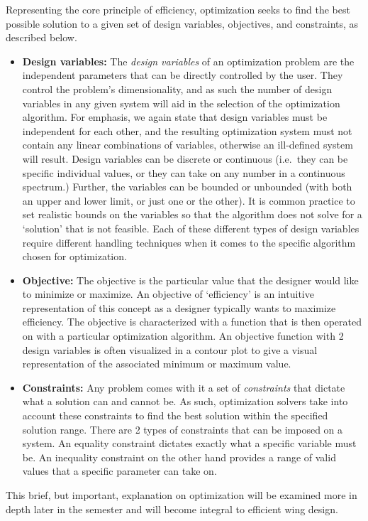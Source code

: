 \documentclass{article}
\begin{document}
Representing the core principle of efficiency, optimization seeks to find the best possible solution to a given set of design variables, objectives, and constraints, as described below.
    \begin{itemize}
        \item[] \textbf{Design variables:} The \textit{design variables} of an optimization problem are the independent parameters that can be directly controlled by the user. They control the problem's dimensionality, and as such the number of design variables in any given system will aid in the selection of the optimization algorithm.
        For emphasis, we again state that design variables must be independent for each other, and the resulting optimization system must not contain any linear combinations of variables, otherwise an ill-defined system will result.
        Design variables can be discrete or continuous (i.e.\ they can be specific individual values, or they can take on any number in a continuous spectrum.)
        Further, the variables can be bounded or unbounded (with both an upper and lower limit, or just one or the other). It is common practice to set realistic bounds on the variables so that the algorithm does not solve for a `solution' that is not feasible.
        Each of these different types of design variables require different handling techniques when it comes to the specific algorithm chosen for optimization.
        \item[] \textbf{Objective:} The objective is the particular value that the designer would like to minimize or maximize. An objective of `efficiency' is an intuitive representation of this concept as a designer typically wants to maximize efficiency.
        The objective is characterized with a function that is then operated on with a particular optimization algorithm. An objective function with 2 design variables is often visualized in a contour plot to give a visual representation of the associated minimum or maximum value.
        \item[] \textbf{Constraints:} Any problem comes with it a set of \textit{constraints} that dictate what a solution can and cannot be. As such, optimization solvers take into account these constraints to find the best solution within the specified solution range.
        There are 2 types of constraints that can be imposed on a system. An equality constraint dictates exactly what a specific variable must be. An inequality constraint on the other hand provides a range of valid values that a specific parameter can take on.
    \end{itemize}
This brief, but important, explanation on optimization will be examined more in depth later in the semester and will become integral to efficient wing design.
\end{document}
